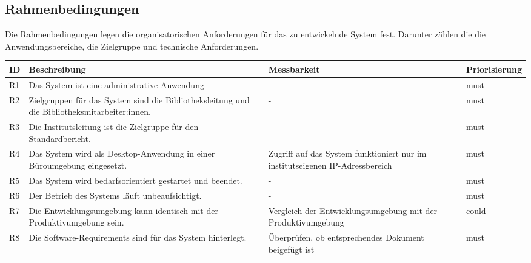 \subsection{Rahmenbedingungen}
Die Rahmenbedingungen legen die organisatorischen Anforderungen für das zu entwickelnde System fest. 
Darunter zählen die die Anwendungsbereiche, die Zielgruppe und technische Anforderungen. 
\begingroup
\setlength{\tabcolsep}{10pt} %
\renewcommand{\arraystretch}{1.25} 
\begin{table}[h]
    \centering
    \begin{adjustbox}{max width=\textwidth}
    \begin{tabular}{lp{6.5cm}p{6.5cm}l}
       \toprule
       \textbf{ID}          & \textbf{Beschreibung} & \textbf{Messbarkeit} & \textbf{Priorisierung}\\
       \midrule
        R1                                &Das System ist eine administrative Anwendung & -  & must\\
        R2                                &Zielgruppen für das System sind die Bibliotheksleitung und die Bibliotheksmitarbeiter:innen. & -  & must\\
        R3                                &Die Institutsleitung ist die Zielgruppe für den Standardbericht. & -  & must\\
        R4                                &Das System wird als Desktop-Anwendung in einer Büroumgebung eingesetzt. & Zugriff auf das System funktioniert nur im institutseigenen IP-Adressbereich & must\\
        R5                                &Das System wird bedarfsorientiert gestartet und beendet. & -  & must\\
        R6                                &Der Betrieb des Systems läuft unbeaufsichtigt. & -  & must\\
        R7                                &Die Entwicklungsumgebung kann identisch mit der Produktivumgebung sein. & Vergleich der Entwicklungsumgebung mit der Produktivumgebung  & could\\
        R8                                &Die Software-Requirements sind für das System hinterlegt. & Überprüfen, ob entsprechendes Dokument beigefügt ist  & must\\

\end{tabular}
\end{adjustbox}
\end{table}
